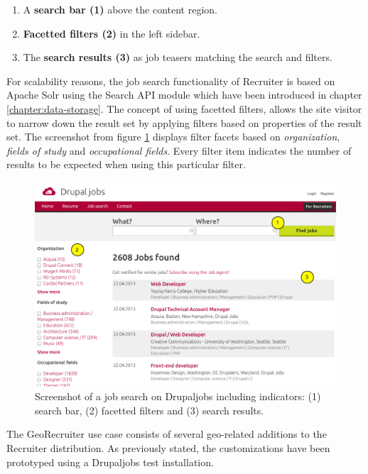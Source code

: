 \begin{enumerate}

\item A \textbf{search bar (1)} above the content region.
\item \textbf{Facetted filters (2)} in the left sidebar.
\item The \textbf{search results (3)} as job teasers matching the search and filters.

\end{enumerate}

For scalability reasons, the job search functionality of Recruiter is based on Apache Solr using the Search API module which have been introduced in chapter \ref{chapter:data-storage}. The concept of using facetted filters, allows the site visitor to narrow down the result set by applying filters based on properties of the result set. The screenshot from figure \ref{fig:recruiter-job-search} displays filter facets based on \textit{organization}, \textit{fields of study} and \textit{occupational fields}. Every filter item indicates the number of results to be expected when using this particular filter. 

\begin{figure}[h]
  \begin{center}
    \includegraphics[width=1\textwidth]{figures/recruiter_job_search.pdf}
    \caption{Screenshot of a job search on Drupaljobs including indicators: (1) search bar, (2) facetted filters and (3) search results.}
    \label{fig:recruiter-job-search}
  \end{center}
\end{figure}

The GeoRecruiter use case consists of several geo-related additions to the Recruiter distribution. As previously stated, the customizations have been prototyped using a Drupaljobs test installation.

